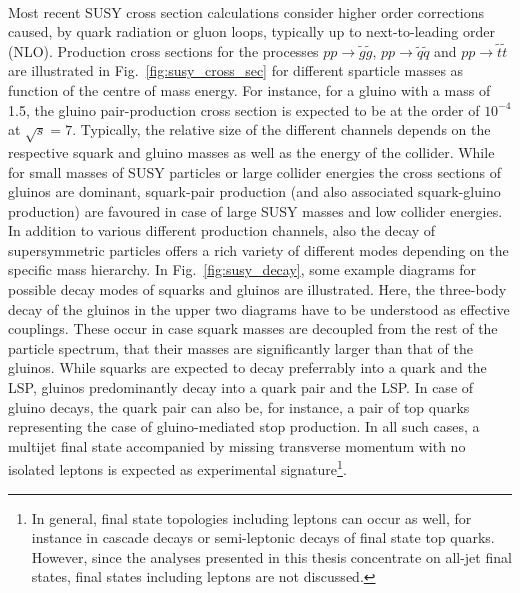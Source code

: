 \\
Most recent SUSY cross section calculations consider higher order corrections caused, \eg by quark radiation or gluon loops, typically up to next-to-leading order (NLO). Production cross sections for the processes $pp \rightarrow \tilde{g}\tilde{g}$, $pp \rightarrow \tilde{q}\tilde{q}$ and $pp \rightarrow \tilde{t}\tilde{t}$ are illustrated in Fig.~\ref{fig:susy_cross_sec} for different sparticle masses as function of the centre of mass energy. For instance, for a gluino with a mass of 1.5\tev, the gluino pair-production cross section is expected to be at the order of $10^{-4}$\pb at $\sqrt{s} = 7$\tev. Typically, the relative size of the different channels depends on the respective squark and gluino masses as well as the energy of the collider. While for small masses of SUSY particles or large collider energies the cross sections of gluinos are dominant, squark-pair production (and also associated squark-gluino production) are favoured in case of large SUSY masses and low collider energies. \\
In addition to various different production channels, also the decay of supersymmetric particles offers a rich variety of different modes depending on the specific mass hierarchy. In Fig.~\ref{fig:susy_decay}, some example diagrams for possible decay modes of squarks and gluinos are illustrated. Here, the three-body decay of the gluinos in the upper two diagrams have to be understood as effective couplings. These occur in case squark masses are decoupled from the rest of the particle spectrum, \ie that their masses are significantly larger than that of the gluinos. While squarks are expected to decay preferrably into a quark and the LSP, gluinos predominantly decay into a quark pair and the LSP. In case of gluino decays, the quark pair can also be, for instance, a pair of top quarks representing the case of gluino-mediated stop production. In all such cases, a multijet final state accompanied by missing transverse momentum with no isolated leptons is expected as experimental signature\footnote{In general, final state topologies including leptons can occur as well, for instance in cascade decays or semi-leptonic decays of final state top quarks. However, since the analyses presented in this thesis concentrate on all-jet final states, final states including leptons are not discussed.}.  
